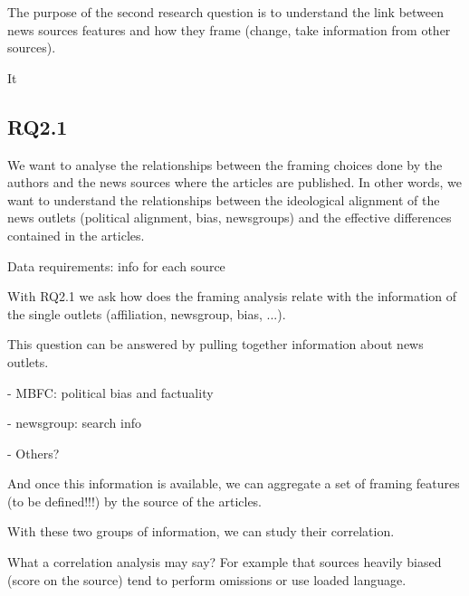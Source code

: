 The purpose of the second research question is to understand the link between news sources features and how they frame (change, take information from other sources).

It 

\subsection{RQ2.1}
We want to analyse the relationships between the framing choices done by the authors and the news sources where the articles are published. In other words, we want to understand the relationships between the ideological alignment of the news outlets (political alignment, bias, newsgroups) and the effective differences contained in the articles.

Data requirements: info for each source




With RQ2.1 we ask how does the framing analysis relate with the information of the single outlets (affiliation, newsgroup, bias, ...).


This question can be answered by pulling together information about news outlets.

- MBFC: political bias and factuality

- newsgroup: search info

- Others?

And once this information is available, we can aggregate a set of framing features (to be defined!!!) by the source of the articles.

With these two groups of information, we can study their correlation.

What a correlation analysis may say? For example that sources heavily biased (score on the source) tend to perform omissions or use loaded language.




